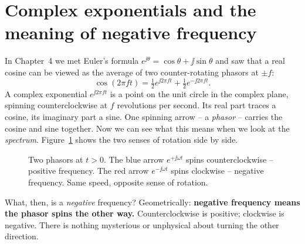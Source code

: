 \section{Complex exponentials and the meaning of negative frequency}

In Chapter~4 we met Euler's formula $e^{\jj\theta} = \cos\theta + \jj\sin\theta$ and saw that
a real cosine can be viewed as the average of two counter-rotating phasors at $\pm f$:
\[
  \cos(2\pi f t) = \tfrac12 e^{\jj 2\pi f t} + \tfrac12 e^{-\jj 2\pi f t}.
\]
A complex exponential $e^{\jj 2\pi f t}$ is a point on the unit circle in the complex
plane, spinning counterclockwise at $f$ revolutions per second. Its real part traces
a cosine, its imaginary part a sine. One spinning arrow -- a \emph{phasor} -- carries
the cosine and sine together. Now we can see what this means when we look at the
\emph{spectrum}.
Figure~\ref{ch05:phasors} shows the two senses of rotation side by side.

\begin{figure}[H]
\centering
{}
\caption{Two phasors at $t>0$. The blue arrow $e^{+\jj\omega t}$ spins
counterclockwise -- positive frequency. The red arrow $e^{-\jj\omega t}$ spins
clockwise -- negative frequency. Same speed, opposite sense of rotation.}
\label{ch05:phasors}
\end{figure}

What, then, is a \emph{negative} frequency? Geometrically: \textbf{negative frequency means the phasor spins the other
way.} Counterclockwise is positive; clockwise is negative. There is nothing
mysterious or unphysical about turning the other direction.

